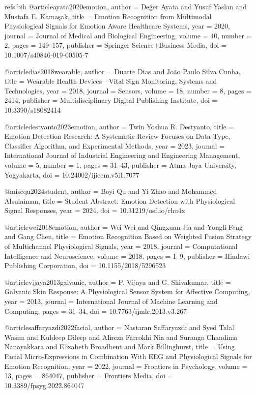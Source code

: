 \begin{filecontents*}[overwrite]{refs.bib}
@article{ayata2020emotion,
  author = {De{\u{g}}er Ayata and Yusuf Yaslan and Mustafa E. Kama{\c{s}}ak},
  title = {{Emotion Recognition from Multimodal Physiological Signals for Emotion Aware Healthcare Systems}},
  year = {2020},
  journal = {Journal of Medical and Biological Engineering},
  volume = {40},
  number = {2},
  pages = {149--157},
  publisher = {Springer Science+Business Media},
  doi = {10.1007/s40846-019-00505-7}
}

@article{dias2018wearable,
  author = {Duarte Dias and Jo{\~a}o Paulo Silva Cunha},
  title = {{Wearable Health Devices---Vital Sign Monitoring, Systems and Technologies}},
  year = {2018},
  journal = {Sensors},
  volume = {18},
  number = {8},
  pages = {2414},
  publisher = {Multidisciplinary Digital Publishing Institute},
  doi = {10.3390/s18082414}
}

@article{destyanto2023emotion,
  author = {Twin Yoshua R. Destyanto},
  title = {{Emotion Detection Research: A Systematic Review Focuses on Data Type, Classifier Algorithm, and Experimental Methods}},
  year = {2023},
  journal = {International Journal of Industrial Engineering and Engineering Management},
  volume = {5},
  number = {1},
  pages = {31--43},
  publisher = {Atma Jaya University, Yogyakarta},
  doi = {10.24002/ijieem.v5i1.7077}
}

@misc{qu2024student,
  author = {Boyi Qu and Yi Zhao and Mohammed Alsulaiman},
  title = {{Student Abstract: Emotion Detection with Physiological Signal Responses}},
  year = {2024},
  doi = {10.31219/osf.io/rhu4x}
}

@article{wei2018emotion,
  author = {Wei Wei and Qingxuan Jia and Yongli Feng and Gang Chen},
  title = {{Emotion Recognition Based on Weighted Fusion Strategy of Multichannel Physiological Signals}},
  year = {2018},
  journal = {Computational Intelligence and Neuroscience},
  volume = {2018},
  pages = {1--9},
  publisher = {Hindawi Publishing Corporation},
  doi = {10.1155/2018/5296523}
}

@article{vijaya2013galvanic,
  author = {P. Vijaya and G. Shivakumar},
  title = {{Galvanic Skin Response: A Physiological Sensor System for Affective Computing}},
  year = {2013},
  journal = {International Journal of Machine Learning and Computing},
  pages = {31--34},
  doi = {10.7763/ijmlc.2013.v3.267}
}

@article{saffaryazdi2022facial,
  author = {Nastaran Saffaryazdi and Syed Talal Wasim and Kuldeep Dileep and Alireza Farrokhi Nia and Suranga Chandima Nanayakkara and Elizabeth Broadbent and Mark Billinghurst},
  title = {{Using Facial Micro-Expressions in Combination With EEG and Physiological Signals for Emotion Recognition}},
  year = {2022},
  journal = {Frontiers in Psychology},
  volume = {13},
  pages = {864047},
  publisher = {Frontiers Media},
  doi = {10.3389/fpsyg.2022.864047}
}


\end{filecontents*}
